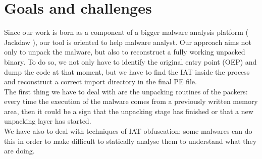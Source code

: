 \section{Goals and challenges}
Since our work is born as a component of a bigger malware analysis platform ( Jackdaw ), our tool is oriented to help malware analyst. 
Our approach aims not only to unpack the malware, but also to reconstruct a fully working unpacked binary. To do so, we not only have to identify the original entry point (OEP) and dump the code at that moment, but we have to find the IAT inside the process and reconstruct a correct import directory in the final PE file.\\

The first thing we have to deal with are the unpacking routines of the packers: every time the execution of the malware comes from a previously written memory area, then it could be a sign that the unpacking stage has finished or that a new unpacking layer has started.\\
We have also to deal with techniques of IAT obfuscation: some malwares can do this in order to make difficult to statically analyse them to understand what they are doing.

